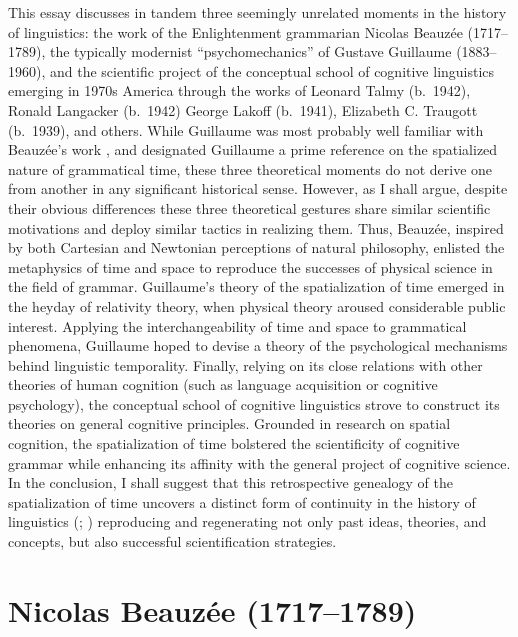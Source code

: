 \documentclass[english,output=paper,colorlinks,citecolor=brown]{../langscibook}
\begin{document}
\hspace*{-1mm}This essay discusses in tandem three seemingly unrelated moments in the history of linguistics: the work of the Enlightenment grammarian Nicolas Beauzée (1717–1789), the typically modernist “psychomechanics” of Gustave Guillaume (1883–1960), and the scientific project of the conceptual school of cognitive linguistics emerging in 1970s America through the works of
Leonard Talmy (b.~1942),
Ronald Langacker (b.~1942)
George Lakoff (b.~1941),
Elizabeth C. Traugott (b.~1939),
and others. While Guillaume was most probably well familiar with Beau\-zée’s work \citep{Fournier2013}, and \citet{Traugott1975} designated Guillaume a prime reference on the spatialized nature of grammatical time, these three theoretical moments do not derive one from another in any significant historical sense. However, as I shall argue, despite their obvious differences these three theoretical gestures share similar scientific motivations and deploy similar tactics in realizing them. Thus, Beauzée, inspired by both Cartesian and Newtonian perceptions of natural philosophy, enlisted the metaphysics of time and space to reproduce the successes of physical science in the field of grammar. Guillaume’s theory of the spatialization of time emerged in the heyday of relativity theory, when physical theory aroused considerable public interest. Applying the interchangeability of time and space to grammatical phenomena, Guillaume hoped to devise a theory of the psychological mechanisms behind linguistic temporality. Finally, relying on its close relations with other theories of human cognition (such as language acquisition or cognitive psychology), the conceptual school of cognitive linguistics strove to construct its theories on general cognitive principles. Grounded in research on spatial cognition, the spatialization of time bolstered the scientificity of cognitive grammar while enhancing its affinity with the general project of cognitive science. In the conclusion, I shall suggest that this retrospective genealogy of the spatialization of time uncovers a distinct form of continuity in the history of linguistics (\citealt{Auroux1980}; \citealt{ColombatEtAl2010}) reproducing and regenerating not only past ideas, theories, and concepts, but also successful scientification strategies.
 
 \section{Nicolas Beauzée (1717–1789)}
 
\end{document}
